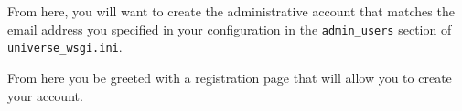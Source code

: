 \documentclass[a4paper,10pt]{article}
\begin{document}
From here, you will want to create the administrative account that matches the email address you specified in your configuration in the \texttt{\footnotesize{admin\_users}} section of \texttt{\footnotesize{universe\_wsgi.ini}}.\vspace{1em}
\setlength\fboxsep{0pt}\vspace{1em}

From here you be greeted with a registration page that will allow you to create your account.\vspace{1em}
\setlength\fboxsep{0pt}\vspace{1em}
\end{document}
